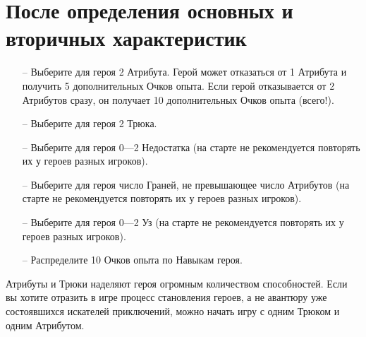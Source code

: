 \section{После определения основных и вторичных характеристик}
\begin{itemize}
\item[--] Выберите для героя 2 Атрибута. Герой может отказаться от 1 Атрибута и получить 5 дополнительных Очков опыта. Если герой отказывается от 2 Атрибутов сразу, он получает 10 дополнительных Очков опыта (всего!).
\item[--] Выберите для героя 2 Трюка.
\item[--] Выберите для героя 0—2 Недостатка (на старте не рекомендуется повторять их у героев разных игроков).
\item[--] Выберите для героя число Граней, не превышающее число Атрибутов (на старте не рекомендуется повторять их у героев разных игроков).
\item[--] Выберите для героя 0—2 Уз (на старте не рекомендуется повторять их у героев разных игроков).
\item[--] Распределите 10 Очков опыта по Навыкам героя.
\end{itemize}
\begin{tcolorbox}
Атрибуты и Трюки наделяют героя огромным количеством способностей. Если вы хотите отразить в игре процесс становления героев, а не авантюру уже состоявшихся искателей приключений, можно начать игру с одним Трюком и одним Атрибутом.
\end{tcolorbox}
